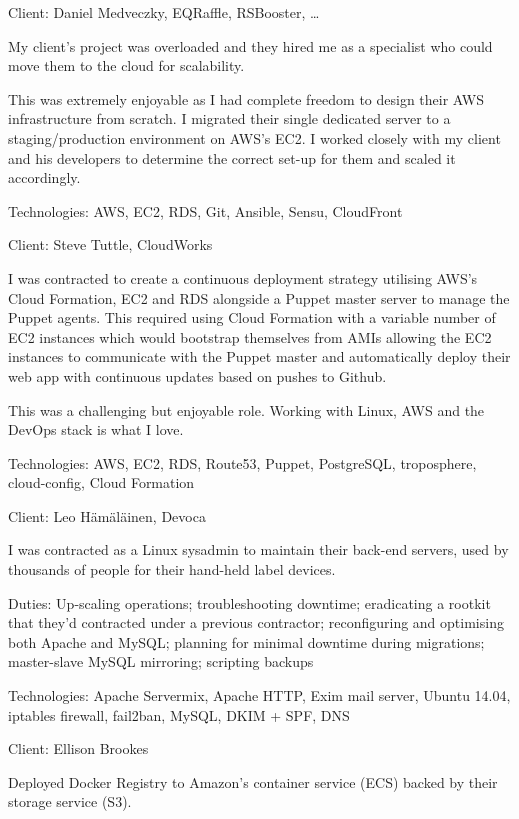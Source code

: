 \documentclass[12pt]{article}
\newenvironment{outerlist}[1][\enskip\textbullet]%
	{\begin{itemize}[#1]}{\end{itemize}%
		\vspace{-.6\baselineskip}}
\newenvironment{innerlist}[1][\enskip\textbullet]%
	{\begin{compactitem}[#1]}{\end{compactitem}}
\newcommand{\halfblankline}{\quad\vspace{-0.5\baselineskip}\pagebreak[3]}
\begin{document}
\begin{outerlist}
			\item[] Client: Daniel Medveczky, EQRaffle, RSBooster, \ldots
			\begin{innerlist}
				\item My client's project was overloaded and they hired me as a specialist who could move them to the cloud for scalability.
				\item This was extremely enjoyable as I had complete freedom to design their AWS infrastructure from scratch. I migrated their single dedicated server to a staging/production environment on AWS's EC2. I worked closely with my client and his developers to determine the correct set-up for them and scaled it accordingly.
				\item Technologies: AWS, EC2, RDS, Git, Ansible, Sensu, CloudFront
			\end{innerlist} 
		
			\halfblankline %
			
			\item[] Client: Steve Tuttle, CloudWorks
			\begin{innerlist}
				\item I was contracted to create a continuous deployment strategy utilising AWS's Cloud Formation, EC2 and RDS alongside a Puppet master server to manage the Puppet agents. This required using Cloud Formation with a variable number of EC2 instances which would bootstrap themselves from AMIs allowing the EC2 instances to communicate with the Puppet master and automatically deploy their web app with continuous updates based on pushes to Github.
				\item This was a challenging but enjoyable role. Working with Linux, AWS and the DevOps stack is what I love.
				\item Technologies: AWS, EC2, RDS, Route53, Puppet, PostgreSQL, troposphere, cloud-config, Cloud Formation
			\end{innerlist}
			\item[] Client: Leo Hämäläinen, Devoca
			\begin{innerlist}
				\item I was contracted as a Linux sysadmin to maintain their back-end servers, used by thousands of people for their hand-held label devices.
				\item Duties: Up-scaling operations; troubleshooting downtime; eradicating a rootkit that they'd contracted under a previous contractor; reconfiguring and optimising both Apache and MySQL; planning for minimal downtime during migrations; master-slave MySQL mirroring; scripting backups
				\item Technologies: Apache Servermix, Apache HTTP, Exim mail server, Ubuntu 14.04, iptables firewall, fail2ban, MySQL, DKIM + SPF, DNS
			\end{innerlist}
			\item[] Client: Ellison Brookes
			\begin{innerlist}
				\item Deployed Docker Registry to Amazon's container service (ECS) backed by their storage service (S3).
			\end{innerlist}
		\end{outerlist}
		
\end{document}
